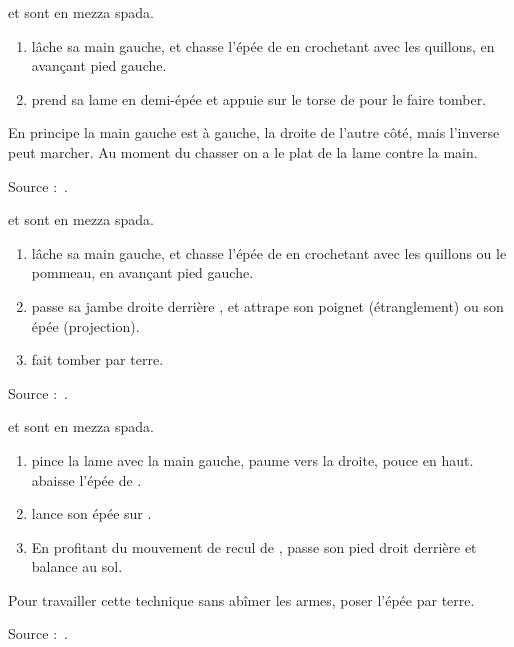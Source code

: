 \begin{technique}

\A et \D sont en mezza spada.

\begin{enumerate}
	\item \A lâche sa main gauche, et chasse l'épée de \D en crochetant avec les quillons, en avançant pied gauche.
	\item \A prend sa lame en demi-épée et appuie sur le torse de \D pour le faire tomber.
\end{enumerate}

En principe la main gauche est à gauche, la droite de l'autre côté, mais l'inverse peut marcher.
Au moment du chasser on a le plat de la lame contre la main.

Source :~\cite{petit:dijon:close_longword:2015}.

\end{technique}


\begin{technique}

\A et \D sont en mezza spada.

\begin{enumerate}
	\item \A lâche sa main gauche, et chasse l'épée de \D en crochetant avec les quillons ou le pommeau, en avançant pied gauche.
	\item \A passe sa jambe droite derrière \D, et attrape son poignet (étranglement) ou son épée (projection).
	\item \A fait tomber \D par terre.
\end{enumerate}

Source :~\cite{petit:dijon:close_longword:2015}.

\end{technique}


\begin{technique}

\A et \D sont en mezza spada.

\begin{enumerate}
	\item \A pince la lame avec la main gauche, paume vers la droite, pouce en haut.
		\A abaisse l'épée de \D.
	\item \A lance son épée sur \D.
	\item En profitant du mouvement de recul de \D, \A passe son pied droit derrière et balance \D au sol.
\end{enumerate}

Pour travailler cette technique sans abîmer les armes, poser l'épée par terre.

Source :~\cite{petit:dijon:close_longword:2015}.

\end{technique}


